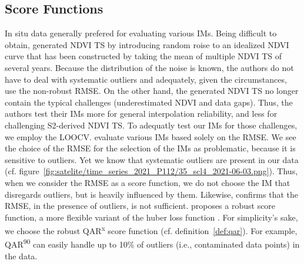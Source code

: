{    \subsection{Score Functions}{
        In situ data generally prefered for evaluating various IMs. Being difficult to obtain, \cite{liHighqualityVegetationIndex2021} generated NDVI TS by introducing random roise to an idealized NDVI curve that has been constructed by taking the mean of multiple NDVI TS of several years. Because the distribution of the noise is known, the authors do not have to deal with systematic outliers and adequately, given the circumstances, use the non-robust RMSE. On the other hand, the generated NDVI TS no longer contain the typical challenges (underestimated NDVI and data gaps). Thus, the authors test their IMs more for general interpolation reliability, and less for challenging S2-derived NDVI TS. To adequatly test our IMs for those challenges, we employ the LOOCV.
        \cite{caiPerformanceSmoothingMethods2017a} evaluate various IMs based solely on the RMSE. We see the choice of the RMSE for the selection of the IMs as problematic, because it is sensitive to outliers. Yet we know that systematic outliers are present in our data (cf. figure~\ref{fig:satelite/time_series_2021_P112/35_scl4_2021-06-03.png}). Thus, when we consider the RMSE as a score function, we do not choose the IM that disregards outliers, but is heavily influenced by them. Likewise, \cite{liemohnRMSENotEnough2021} confirms that the RMSE, in the presence of outliers, is not sufficient. \cite{barronGeneralAdaptiveRobust2019} proposes a robust score function, a more flexible variant of the huber loss function \citep{huberRobustEstimationLocation1964}. For simplicity's sake, we choose the robust QAR\textsuperscript{x} score function (cf. definition~\ref{def:qar}). For example, QAR\textsuperscript{90} can easily handle up to 10\% of outliers (i.e., contaminated data points) in the data.                 
    }
}


